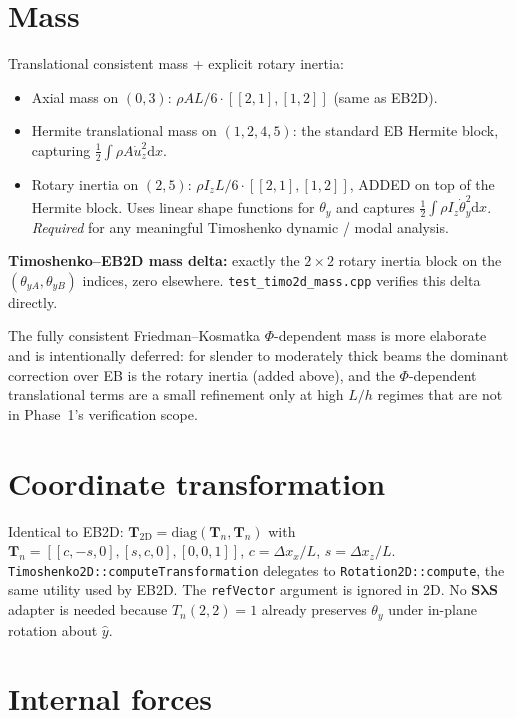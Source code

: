 \documentclass[11pt,a4paper]{book}
\newcommand{\dd}{\mathrm{d}}
\newcommand{\bmath}[1]{\boldsymbol{#1}}
\newcommand{\yhat}{\hat{y}}
\newcommand{\Sdiag}{\bmath{S}}
\newcommand{\lam}{\bmath{\lambda}}
\begin{document}
\section{Mass}

Translational consistent mass + explicit rotary inertia:
\begin{itemize}
    \item Axial mass on $(0, 3)$: $\rho A L / 6 \cdot [[2,1],[1,2]]$ (same as EB2D).
    \item Hermite translational mass on $(1, 2, 4, 5)$: the standard EB Hermite block, capturing $\tfrac{1}{2} \int \rho A \dot u_z^2 \dd x$.
    \item Rotary inertia on $(2, 5)$: $\rho I_z L / 6 \cdot [[2,1],[1,2]]$, ADDED on top of the Hermite block. Uses linear shape functions for $\theta_y$ and captures $\tfrac{1}{2} \int \rho I_z \dot\theta_y^2 \dd x$. \emph{Required} for any meaningful Timoshenko dynamic / modal analysis.
\end{itemize}
\textbf{Timoshenko--EB2D mass delta:} exactly the $2\times 2$ rotary inertia block on the $(\theta_{yA}, \theta_{yB})$ indices, zero elsewhere. \texttt{test\_timo2d\_mass.cpp} verifies this delta directly.

The fully consistent Friedman--Kosmatka $\Phi$-dependent mass is more elaborate and is intentionally deferred: for slender to moderately thick beams the dominant correction over EB is the rotary inertia (added above), and the $\Phi$-dependent translational terms are a small refinement only at high $L/h$ regimes that are not in Phase~1's verification scope.

\section{Coordinate transformation}

Identical to EB2D: $\bmath{T}_{\text{2D}} = \mathrm{diag}(\bmath{T}_n, \bmath{T}_n)$ with $\bmath{T}_n = [[c, -s, 0], [s, c, 0], [0, 0, 1]]$, $c = \Delta x_x / L$, $s = \Delta x_z / L$. \texttt{Timoshenko2D::computeTransformation} delegates to \texttt{Rotation2D::compute}, the same utility used by EB2D. The \texttt{refVector} argument is ignored in 2D. No $\Sdiag\lam\Sdiag$ adapter is needed because $T_n(2,2) = 1$ already preserves $\theta_y$ under in-plane rotation about $\yhat$.

\section{Internal forces}
\end{document}
